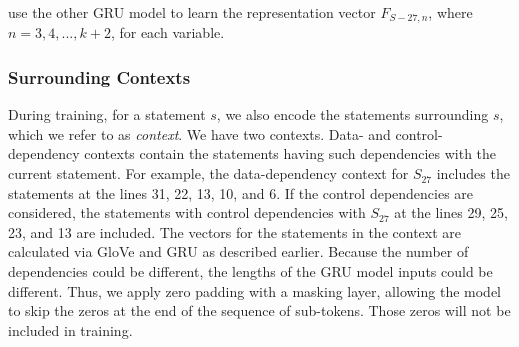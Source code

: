 use the other GRU model to learn the representation vector $F_{S-27, n}$, where $n = {3,4,...,k+2}$, for each variable.



\vspace{-1pt}
\subsubsection{Surrounding Contexts}

During training, for a statement $s$, we also encode the statements
surrounding $s$, which we refer to as {\em context}.  We have two
contexts. Data- and control-dependency contexts contain the
statements having such dependencies with the current statement.
For example, the data-dependency context for $S_{27}$ includes
the statements at the lines 31, 22, 13, 10, and 6.  If the control
dependencies are considered, the statements with control dependencies
with $S_{27}$ at the lines 29, 25, 23, and 13 are included.
%
The vectors for the statements in the context are calculated via GloVe
and GRU as described earlier. Because the number of dependencies could be
different, the lengths of the GRU model inputs could be
different. Thus, we apply zero padding with a masking layer, allowing the model to skip the zeros at the end of the sequence of
sub-tokens. Those zeros will not be included in training.



%

